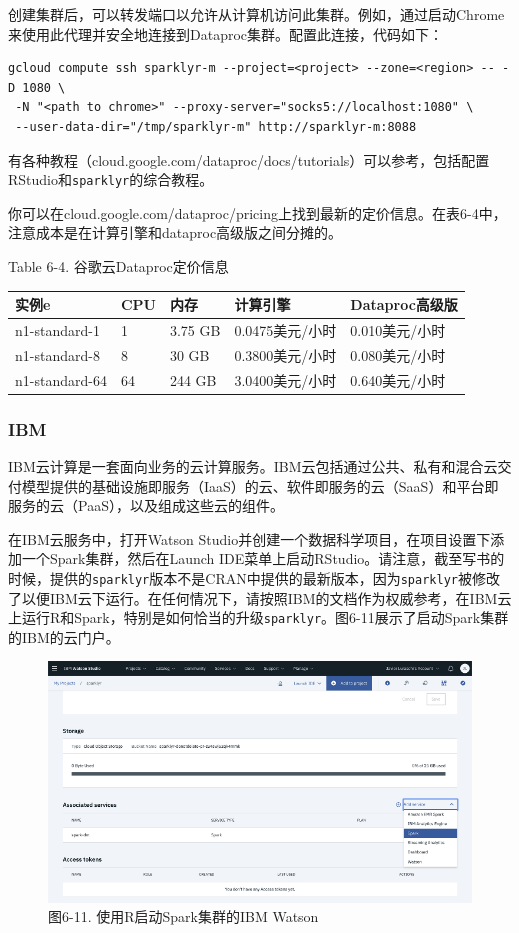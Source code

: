 \documentclass[
]{article}
\begin{document}
创建集群后，可以转发端口以允许从计算机访问此集群。例如，通过启动Chrome来使用此代理并安全地连接到Dataproc集群。配置此连接，代码如下：

\begin{verbatim}
gcloud compute ssh sparklyr-m --project=<project> --zone=<region> -- -D 1080 \
 -N "<path to chrome>" --proxy-server="socks5://localhost:1080" \
 --user-data-dir="/tmp/sparklyr-m" http://sparklyr-m:8088
\end{verbatim}

有各种教程（cloud.google.com/dataproc/docs/tutorials）可以参考，包括配置RStudio和\texttt{sparklyr}的综合教程。

你可以在cloud.google.com/dataproc/pricing上找到最新的定价信息。在表6-4中，注意成本是在计算引擎和dataproc高级版之间分摊的。

Table 6-4. 谷歌云Dataproc定价信息

\begin{longtable}[]{@{}lllll@{}}
\toprule
实例e & CPU & 内存 & 计算引擎 & Dataproc高级版\tabularnewline
\midrule
\endhead
n1-standard-1 & 1 & 3.75 GB & 0.0475美元/小时 &
0.010美元/小时\tabularnewline
n1-standard-8 & 8 & 30 GB & 0.3800美元/小时 &
0.080美元/小时\tabularnewline
n1-standard-64 & 64 & 244 GB & 3.0400美元/小时 &
0.640美元/小时\tabularnewline
\bottomrule
\end{longtable}

\hypertarget{ibm}{%
\subsubsection{IBM}\label{ibm}}

IBM云计算是一套面向业务的云计算服务。IBM云包括通过公共、私有和混合云交付模型提供的基础设施即服务（IaaS）的云、软件即服务的云（SaaS）和平台即服务的云（PaaS），以及组成这些云的组件。

在IBM云服务中，打开Watson
Studio并创建一个数据科学项目，在项目设置下添加一个Spark集群，然后在Launch
IDE菜单上启动RStudio。请注意，截至写书的时候，提供的\texttt{sparklyr}版本不是CRAN中提供的最新版本，因为\texttt{sparklyr}被修改了以便IBM云下运行。在任何情况下，请按照IBM的文档作为权威参考，在IBM云上运行R和Spark，特别是如何恰当的升级\texttt{sparklyr}。图6-11展示了启动Spark集群的IBM的云门户。

\begin{figure}
\centering
\includegraphics{figures/6_11.png}
\caption{图6-11. 使用R启动Spark集群的IBM Watson}
\end{figure}
\end{document}

